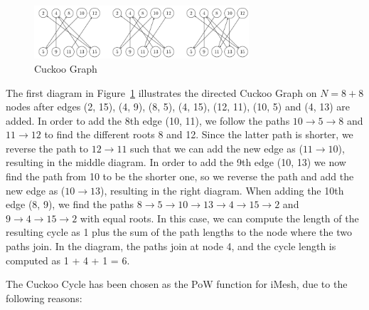 \documentclass[a4paper,10pt,twocolumn]{article}
\begin{document}
	\begin{figure}[ht]
		\begin{center}
		\includegraphics[width=80mm]{cuckoo.png}
		  \caption{Cuckoo Graph}
		\label{fig:cuckoo}
		\end{center}
	 \end{figure}
	
	\vspace{-3.5mm}
	
	The first diagram in Figure~\ref{fig:cuckoo} illustrates the directed Cuckoo Graph on \( N = 8 + 8 \) nodes after edges (2, 15), (4, 
	9), (8, 5), (4, 15), (12, 11), (10, 5) and (4, 13) are added. In order to add the 8th edge (10, 11), we follow the paths \( 10 
	\rightarrow 5 \rightarrow 8 \) and \( 11 \rightarrow 12 \) to find the different roots 8 and 12. Since the latter path is shorter, we 
	reverse the path to \( 12 \rightarrow 11\) such that we can add the new edge as (\( 11 \rightarrow 10\)), resulting in the middle 
	diagram. In order to add the 9th edge (10, 13) we now find the path from 10 to be the shorter one, so we reverse the path and add the 
	new edge as (\( 10 \rightarrow 13\)), resulting in the right diagram. When adding the 10th edge (8, 9), we find the paths
	 \( 8 \rightarrow 5 \rightarrow 10 \rightarrow 13 \rightarrow 4  \rightarrow 15 \rightarrow 2 \) and \( 9 \rightarrow 4 \rightarrow 15 
	 \rightarrow 2 \)  with equal roots. In this case, we can compute the length of the resulting cycle as 1 plus the sum of the path lengths to the node where the two paths join. In the diagram, the paths join at node 4, and the cycle length is computed as 1 + 4 + 1 
	 = 6.
	
	\vspace{2.5mm}
	
	The Cuckoo Cycle has been chosen as the PoW function for iMesh, due to the following reasons:
	
\end{document}
